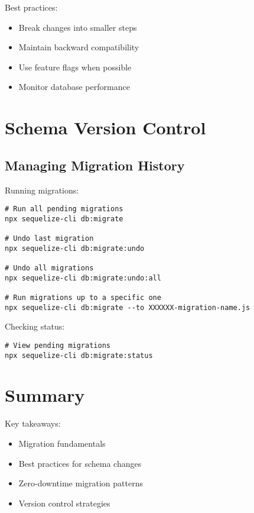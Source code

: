 \documentclass[12pt,a4paper]{book}
\begin{document}
		Best practices:
		\begin{itemize}
			\item Break changes into smaller steps
			\item Maintain backward compatibility
			\item Use feature flags when possible
			\item Monitor database performance
		\end{itemize}
	
	\section{Schema Version Control}
	
	\subsection{Managing Migration History}
	\begin{tcolorbox}[title=Migration Management]
		Running migrations:
		
		\begin{verbatim}
# Run all pending migrations
npx sequelize-cli db:migrate

# Undo last migration
npx sequelize-cli db:migrate:undo

# Undo all migrations
npx sequelize-cli db:migrate:undo:all

# Run migrations up to a specific one
npx sequelize-cli db:migrate --to XXXXXX-migration-name.js
		\end{verbatim}
		
		Checking status:
		
		\begin{verbatim}
# View pending migrations
npx sequelize-cli db:migrate:status
		\end{verbatim}
	\end{tcolorbox}
	
	
	\section{Summary}
	Key takeaways:
	\begin{itemize}
		\item Migration fundamentals
		\item Best practices for schema changes
		\item Zero-downtime migration patterns
		\item Version control strategies
	\end{itemize}
	
\end{document}

